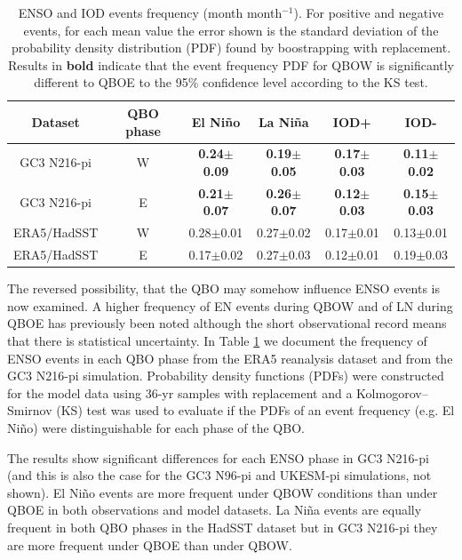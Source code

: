 \begin{table}[t!]
\caption{ENSO and IOD events frequency (month month$^{-1}$). For positive and negative events, for each mean value the error shown is the standard deviation of the probability density distribution (PDF) found by boostrapping with replacement. Results in \textbf{bold}  indicate that the event frequency PDF for QBOW is significantly different to QBOE to the 95\% confidence level according to the KS test.  }\label{t1}
\begin{center}
\begin{tabular}{cccccc}
\hline\hline
Dataset & QBO phase & El Niño & La Niña & IOD+ & IOD-  \\
\hline
GC3 N216-pi & W 	& \textbf{0.24$\pm$0.09} & \textbf{0.19$\pm$0.05} & \textbf{0.17$\pm$0.03}	 & \textbf{0.11$\pm$0.02} \\
GC3 N216-pi & E  & \textbf{0.21$\pm$0.07} & \textbf{0.26$\pm$0.07} & \textbf{0.12$\pm$0.03} 	 & \textbf{0.15$\pm$0.03}  \\
ERA5/HadSST & W & 0.28$\pm$0.01 & 0.27$\pm$0.02 & 0.17$\pm$0.01  &0.13$\pm$0.01 \\
ERA5/HadSST & E  & 0.17$\pm$0.02 & 0.27$\pm$0.03 &0.12$\pm$0.01 & 0.19$\pm$0.03 \\
\hline
\end{tabular}
\end{center}
\end{table}

The reversed possibility, that the QBO may somehow influence ENSO events is now examined. A higher frequency of EN events during QBOW and of LN during QBOE has previously been noted \citep{taguchi2010,liess2012} although the short observational record means that there is statistical uncertainty.  In Table \ref{t1} we document the frequency of ENSO events in each QBO phase from the ERA5 reanalysis dataset and from the GC3 N216-pi simulation. Probability density functions (PDFs) were constructed for the model data using 36-yr samples with replacement and a Kolmogorov–Smirnov (KS) test was used to evaluate if the PDFs of an event frequency (e.g. El Niño) were distinguishable for each phase of the QBO. 

The results show significant differences for each ENSO phase in GC3 N216-pi (and this is also the case for the GC3 N96-pi and UKESM-pi simulations, not shown). El Niño events are more frequent under QBOW conditions than under QBOE in both observations and model datasets.  La Niña events are equally frequent in both QBO phases in the HadSST dataset but in GC3 N216-pi they are more frequent under QBOE than under QBOW. 

